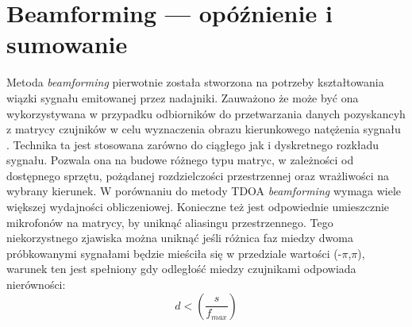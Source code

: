\documentclass[eng,printmode]{mgr}
\begin{document}
\section{Beamforming --- opóźnienie i sumowanie}
Metoda {\em beamforming} pierwotnie została stworzona na potrzeby kształtowania wiązki sygnału emitowanej przez nadajniki. Zauważono że może być ona wykorzystywana w przypadku odbiorników do przetwarzania danych pozyskancyh z matrycy czujników w celu wyznaczenia obrazu kierunkowego natężenia sygnału . Technika ta jest stosowana zarówno do ciągłego jak i dyskretnego rozkładu sygnału. Pozwala ona na budowe różnego typu matryc, w zależności od dostępnego sprzętu, pożądanej rozdzielczości przestrzennej oraz wrażliwości na wybrany kierunek. W porównaniu do metody TDOA {\em beamforming} wymaga wiele większej wydajności obliczeniowej. Konieczne też jest odpowiednie umieszcznie mikrofonów na matrycy, by uniknąć aliasingu przestrzennego.
\newline Tego niekorzystnego zjawiska można uniknąć jeśli różnica faz miedzy dwoma próbkowanymi sygnałami będzie mieściła się w przedziale wartości (-$\pi$,$\pi$), warunek ten jest spełniony gdy odległość miedzy czujnikami odpowiada nierówności:
\begin{equation}
 d <(\frac{s}{f_{max}}) 
\end{equation}
\end{document}
